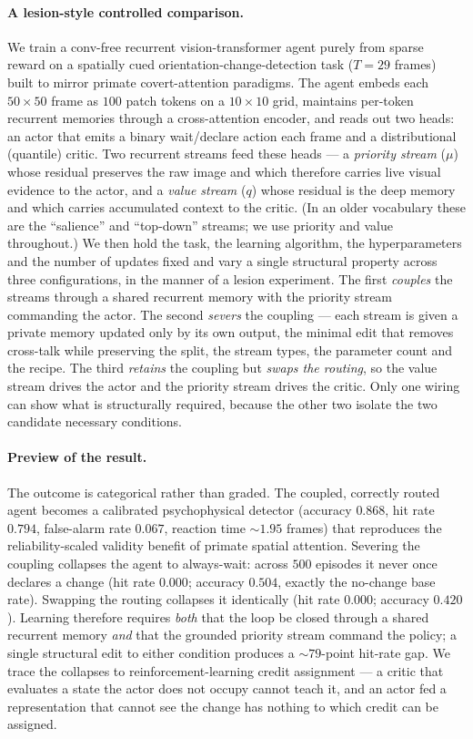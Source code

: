 \paragraph{A lesion-style controlled comparison.}
We train a conv-free recurrent vision-transformer agent purely from sparse reward on a spatially cued orientation-change-detection task ($T=29$ frames) built to mirror primate covert-attention paradigms. The agent embeds each $50\times50$ frame as $100$ patch tokens on a $10\times10$ grid, maintains per-token recurrent memories through a cross-attention encoder, and reads out two heads: an actor that emits a binary wait/declare action each frame and a distributional (quantile) critic. Two recurrent streams feed these heads --- a \emph{priority stream} ($\mu$) whose residual preserves the raw image and which therefore carries live visual evidence to the actor, and a \emph{value stream} ($q$) whose residual is the deep memory and which carries accumulated context to the critic. (In an older vocabulary these are the ``salience'' and ``top-down'' streams; we use priority and value throughout.) We then hold the task, the learning algorithm, the hyperparameters and the number of updates fixed and vary a single structural property across three configurations, in the manner of a lesion experiment. The first \emph{couples} the streams through a shared recurrent memory with the priority stream commanding the actor. The second \emph{severs} the coupling --- each stream is given a private memory updated only by its own output, the minimal edit that removes cross-talk while preserving the split, the stream types, the parameter count and the recipe. The third \emph{retains} the coupling but \emph{swaps the routing}, so the value stream drives the actor and the priority stream drives the critic. Only one wiring can show what is structurally required, because the other two isolate the two candidate necessary conditions.

\paragraph{Preview of the result.}
The outcome is categorical rather than graded. The coupled, correctly routed agent becomes a calibrated psychophysical detector (accuracy $0.868$, hit rate $0.794$, false-alarm rate $0.067$, reaction time $\sim$$1.95$ frames) that reproduces the reliability-scaled validity benefit of primate spatial attention. Severing the coupling collapses the agent to always-wait: across $500$ episodes it never once declares a change (hit rate $0.000$; accuracy $0.504$, exactly the no-change base rate). Swapping the routing collapses it identically (hit rate $0.000$; accuracy $0.420$). Learning therefore requires \emph{both} that the loop be closed through a shared recurrent memory \emph{and} that the grounded priority stream command the policy; a single structural edit to either condition produces a $\sim$$79$-point hit-rate gap. We trace the collapses to reinforcement-learning credit assignment --- a critic that evaluates a state the actor does not occupy cannot teach it, and an actor fed a representation that cannot see the change has nothing to which credit can be assigned.

